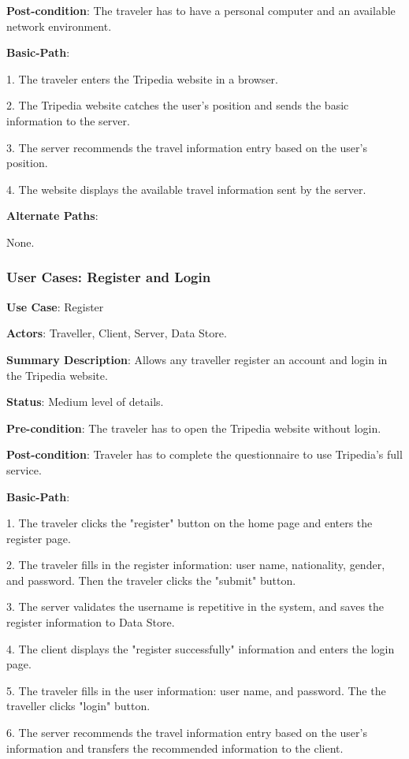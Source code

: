 \documentclass[conference]{IEEEtran}
\begin{document}
\textbf{Post-condition}: The traveler has to have a personal computer and an available network environment.

\textbf{Basic-Path}:

1. The traveler enters the Tripedia website in a browser.

2. The Tripedia website catches the user's position and sends the basic information to the server.

3. The server recommends the travel information entry based on the user's position.

4. The website displays the available travel information sent by the server.

\textbf{Alternate Paths}:

None.

\subsubsection{User Cases: Register and Login}

\textbf{ }

\textbf{Use Case}: Register

\textbf{Actors}: Traveller, Client, Server, Data Store.

\textbf{Summary Description}: Allows any traveller register an account and login in the Tripedia website.
 
\textbf{Status}: Medium level of details.

\textbf{Pre-condition}: The traveler has to open the Tripedia website without login.

\textbf{Post-condition}: Traveler has to complete the questionnaire to use Tripedia's full service.

\textbf{Basic-Path}:

1. The traveler clicks the "register" button on the home page and enters the register page.

2. The traveler fills in the register information: user name, nationality, gender, and password. Then the traveler clicks the "submit" button.

3. The server validates the username is repetitive in the system, and saves the register information to Data Store.

4. The client displays the "register successfully" information and enters the login page.

5. The traveler fills in the user information: user name, and password. The the traveller clicks "login" button.

6. The server recommends the travel information entry based on the user's information and transfers the recommended information to the client.
\end{document}
